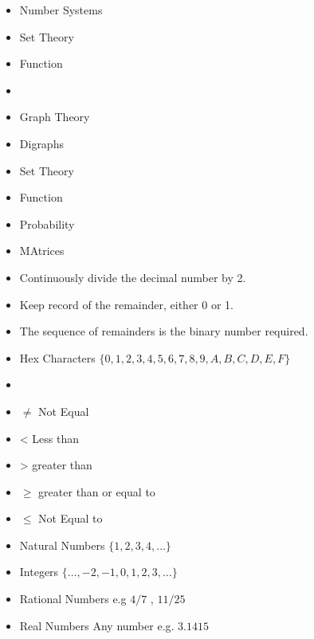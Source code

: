 \documentclass[]{report}
\begin{document}
\begin{itemize}
	\item Number Systems
	\item Set Theory
	\item Function
	\item 
	\item Graph Theory
\end{itemize}



\begin{itemize}
	\item Digraphs
	\item Set Theory
	\item Function
	\item Probability
	\item MAtrices
\end{itemize}



\begin{itemize}
	\item Continuously divide the decimal number by 2.
	\item Keep record of the remainder, either 0 or 1.
	\item The sequence of remainders is the binary number required.
\end{itemize}


\begin{itemize}
	\item Hex Characters $\{0,1,2,3,4,5,6,7,8,9,A,B,C,D,E,F\}$
	\item 
\end{itemize}


\begin{itemize}
	\item $\neq$ Not Equal
	\item < Less than
	\item > greater than
	\item $\geq$ greater than or equal to
	\item $\leq$ Not Equal to
\end{itemize}


\begin{itemize}
	\item Natural Numbers $\{1,2,3,4, \ldots\}$
	\item Integers $\{\ldots,-2,-1,0,1,2,3,\ldots\}$
	\item Rational Numbers e.g $4/7$ , $11/25$
	\item Real Numbers Any number e.g. $3.1415$
\end{itemize}
\end{document}
